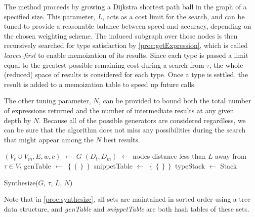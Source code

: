 The method proceeds by growing a Dijkstra shortest path ball in the graph of a specified size. This parameter, $L$, acts as a cost limit for the search, and can be tuned to provide a reasonable balance between speed and accuracy, depending on the chosen weighting scheme. The induced subgraph over those nodes is then recursively searched for type satisfaction by \ref{proc:getExpression}, which is called \textit{leaves-first} to enable memoization of its results. Since each type is passed a limit equal to the greatest possible remaining cost during a search from $\tau$, the whole (reduced) space of results is considered for each type. Once a type is settled, the result is added to a memoization table to speed up future calls.

The other tuning parameter, $N$, can be provided to bound both the total number of expressions returned and the number of intermediate results at any given depth by $N$. Because all of the possible generators are considered regardless, we can be sure that the algorithm does not miss any possibilities during the search that might appear among the $N$ best results.

\begin{procedure}
$(V_t\cup V_m, E, w, c)$ $\leftarrow$ $G$ \;
$(D_t, D_m)$ $\leftarrow$ nodes distance less than $L$ away from $\tau\in V_t$\;
genTable $\leftarrow$ $\left\{\left\{\right\}\right\}$ \;
snippetTable $\leftarrow$ $\left\{\left\{\right\}\right\}$ \;
typeStack $\leftarrow$ \KwNew Stack\;
\;
\caption{Synthesize($G$, $\tau$, $L$, $N$)}
\label{proc:synthesize}
\end{procedure}

Note that in \ref{proc:synthesize}, all sets are maintained in sorted order using a tree data structure, and \textit{genTable} and \textit{snippetTable} are both hash tables of these sets.

